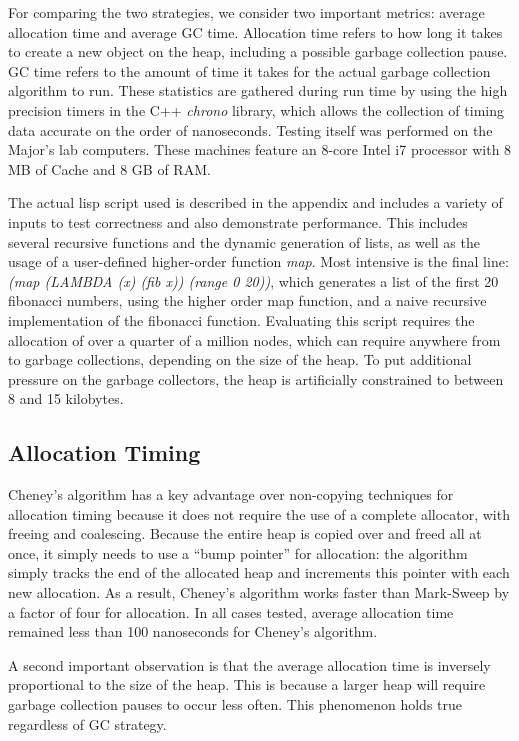 \documentclass[11pt,leqno]{article}
\begin{document}
For comparing the two strategies, we consider two important metrics: average allocation time and average GC time. Allocation time refers to how long it takes to create a new object on the heap, including a possible garbage collection pause. GC time refers to the amount of time it takes for the actual garbage collection algorithm to run. These statistics are gathered during run time by using the high precision timers in the C++ \emph{chrono} library, which allows the collection of timing data accurate on the order of nanoseconds. Testing itself was performed on the Major's lab computers. These machines feature an 8-core Intel i7 processor with 8 MB of Cache and 8 GB of RAM.

The actual lisp script used is described in the appendix and includes a variety of inputs to test correctness and also demonstrate performance. This includes several recursive functions and the dynamic generation of lists, as well as the usage of a user-defined higher-order function \emph{map}. Most intensive is the final line: \emph{(map (LAMBDA (x) (fib x)) (range 0 20))}, which generates a list of the first 20 fibonacci numbers, using the higher order map function, and a naive recursive implementation of the fibonacci function. Evaluating this script requires the allocation of over a quarter of a million nodes, which can require anywhere from  to  garbage collections, depending on the size of the heap. To put additional pressure on the garbage collectors, the heap is artificially constrained to between 8 and 15 kilobytes.

\subsection{Allocation Timing}

Cheney's algorithm has a key advantage over non-copying techniques for allocation timing because it does not require the use of a complete allocator, with freeing and coalescing. Because the entire heap is copied over and freed all at once, it simply needs to use a ``bump pointer'' for allocation: the algorithm simply tracks the end of the allocated heap and increments this pointer with each new allocation. As a result, Cheney's algorithm works faster than Mark-Sweep by a factor of four for allocation. In all cases tested, average allocation time remained less than 100 nanoseconds for Cheney's algorithm. 

A second important observation is that the average allocation time is inversely proportional to the size of the heap. This is because a larger heap will require garbage collection pauses to occur less often. This phenomenon holds true regardless of GC strategy.
\end{document}
